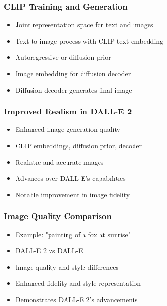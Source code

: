 \begin{frame}[fragile]\frametitle{CLIP Training and Generation}
    
    \begin{itemize}
        \item Joint representation space for text and images
        \item Text-to-image process with CLIP text embedding
        \item Autoregressive or diffusion prior
        \item Image embedding for diffusion decoder
        \item Diffusion decoder generates final image
    \end{itemize}
\end{frame}

\begin{frame}[fragile]\frametitle{Improved Realism in DALL-E 2}
    
    \begin{itemize}
        \item Enhanced image generation quality
        \item CLIP embeddings, diffusion prior, decoder
        \item Realistic and accurate images
        \item Advances over DALL-E's capabilities
        \item Notable improvement in image fidelity
    \end{itemize}
\end{frame}

\begin{frame}[fragile]\frametitle{Image Quality Comparison}
    
    \begin{itemize}
        \item Example: "painting of a fox at sunrise"
        \item DALL-E 2 vs DALL-E
        \item Image quality and style differences
        \item Enhanced fidelity and style representation
        \item Demonstrates DALL-E 2's advancements
    \end{itemize}
\end{frame}

